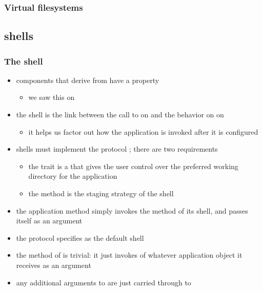 \begin{frame}
%
  \frametitle{Virtual filesystems}
%
\end{frame}

\subsection{shells}
\begin{frame}
%
  \frametitle{The  shell}
%
  \begin{itemize}
%
  \item components that derive from  have a property 
    \begin{itemize}
    \item we saw this on 
    \end{itemize}
%
  \item the shell is the link between the call to  on
     and the behavior  on
     on 
    \begin{itemize}
    \item it helps us factor out how the application is invoked after it is configured
    \end{itemize}
%
  \item shells must implement the protocol ; there are two requirements
    \begin{itemize}
    \item the trait  is a  that gives the user control over the
      preferred working directory for the application
    \item the method  is the staging strategy of the shell
    \end{itemize}
%
  \item the application method  simply invokes the method  of its
    shell, and passes itself as an argument
%
  \item the protocol  specifies  as the default shell
%
  \item the method  of  is trivial: it just invokes 
    of whatever application object it receives as an argument
%
  \item any additional arguments to  are just carried through to 
%
  \end{itemize}
%
\end{frame}

